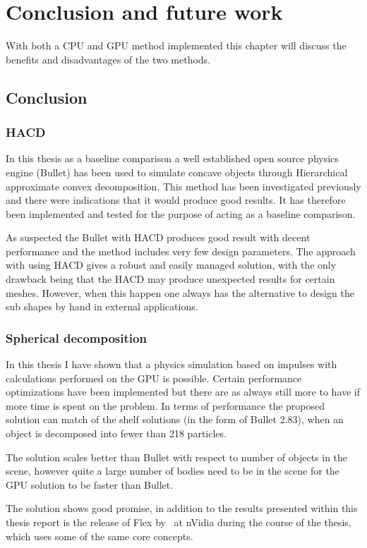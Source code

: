 \chapter{Conclusion and future work}
With both a CPU and GPU method implemented this chapter will discuss the benefits
and disadvantages of the two methods.
\section{Conclusion}
\subsection{HACD}
In this thesis as a baseline comparison a well established open source physics engine
(Bullet) has been used to simulate concave objects through Hierarchical approximate
 convex decomposition. This method has been investigated previously and there were
 indications that it would produce good results. It has therefore been implemented
 and tested for the purpose of acting as a baseline comparison.

As suspected the Bullet with HACD produces good result with decent performance and
the method includes very few design parameters. The approach with using HACD gives
a robust and easily managed solution, with the only drawback being that the HACD
may produce unexpected results for certain meshes. However, when this happen
one always has the alternative to design the sub shapes by hand in external applications.

\subsection{Spherical decomposition}
In this thesis I have shown that a physics simulation based on impulses with
calculations performed on the GPU is possible. Certain performance optimizations
have been implemented but there are as always still more to have if more time is
spent on the problem. In terms of performance the proposed solution can match of the shelf
solutions (in the form of Bullet 2.83), when an object is decomposed into fewer than
218 particles.

The solution scales better than Bullet with respect to number of objects in the scene,
however quite a large number of bodies need to be in the scene for the GPU solution
to be faster than Bullet.

The solution shows good promise, in addition to the results presented within this
thesis report is the release of Flex by~\cite{flex} at nVidia
during the course of the thesis, which uses some of the same core concepts.

